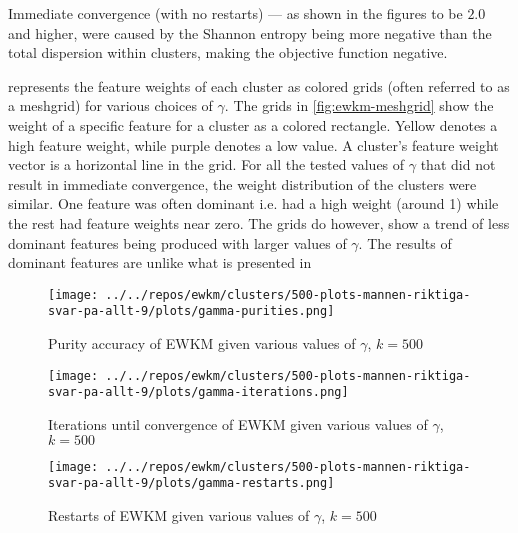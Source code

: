 \documentclass[../report.tex]{subfiles}
\begin{document}
Immediate convergence (with no restarts) --- as shown in the figures to be $2.0$ and higher, were caused by the Shannon entropy being more negative than the total dispersion within clusters, making the objective function negative.

 represents the feature weights of each cluster as colored grids (often referred to as a meshgrid) for various choices of $\gamma$. The grids in \cref{fig:ewkm-meshgrid} show the weight of a specific feature for a cluster as a colored rectangle. Yellow denotes a high feature weight, while purple denotes a low value. A cluster's feature weight vector is a horizontal line in the grid. For all the tested values of $\gamma$ that did not result in immediate convergence, the weight distribution of the clusters were similar. One feature was often dominant i.e. had a high weight (around 1) while the rest had feature weights near zero. The grids do however, show a trend of less dominant features being produced with larger values of $\gamma$. The results of dominant features are unlike what is presented in \cite{Jing2007}

\begin{frame}

  \begin{figure}
\begin{minipage}{.45\textwidth}
  \texttt{[image: ../../repos/ewkm/clusters/500-plots-mannen-riktiga-svar-pa-allt-9/plots/gamma-purities.png]}
  \caption{Purity accuracy of EWKM given various values of $\gamma$, $k=500$}
  \label{fig:ewkm-purity}
\end{minipage}\hfill
\begin{minipage}{.45\textwidth}
  \texttt{[image: ../../repos/ewkm/clusters/500-plots-mannen-riktiga-svar-pa-allt-9/plots/gamma-iterations.png]}
  \caption{Iterations until convergence of EWKM given various values of $\gamma$, $k=500$}
  \label{fig:ewkm-iterations}
\end{minipage}\hfill
\centering
\begin{minipage}{.45\textwidth}
  \texttt{[image: ../../repos/ewkm/clusters/500-plots-mannen-riktiga-svar-pa-allt-9/plots/gamma-restarts.png]}
  \caption{Restarts of EWKM given various values of $\gamma$, $k=500$}
  \label{fig:ewkm-restarts}
\end{minipage}
\end{figure}

\end{frame}
\end{document}
